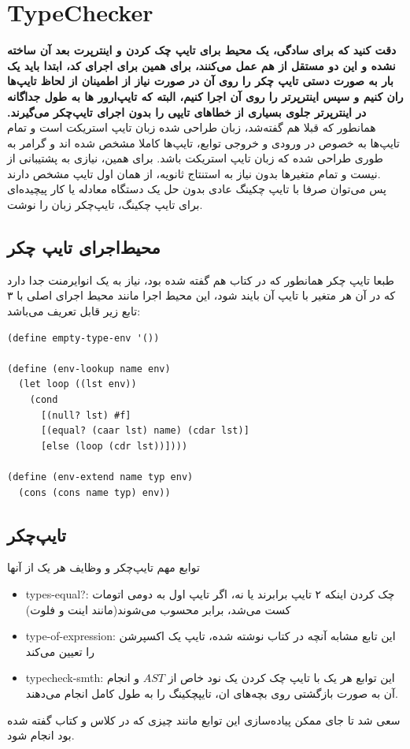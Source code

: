 \documentclass{article}
\begin{document}
\section{TypeChecker}
\textbf{دقت کنید که برای سادگی، یک محیط برای تایپ چک کردن و اینترپرت بعد آن ساخته نشده و این دو مستقل از هم عمل می‌کنند، برای همین برای 
اجرای کد، ابتدا باید یک بار به صورت دستی تایپ چکر را روی آن در صورت نیاز از اطمینان از لحاظ تایپ‌ها ران کنیم و سپس اینترپرتر را روی آن اجرا کنیم، 
البته که تایپ‌ارور ها به طول جداگانه در اینترپرتر جلوی بسیاری از خطا‌های تایپی را بدون اجرای تایپ‌چکر می‌گیرند.
}
همانطور که قبلا هم گفته‌شد، زبان طراحی شده زبان تایپ استریکت است و تمام تایپ‌ها به خصوص در ورودی و خروجی توابع، 
تایپ‌ها کاملا مشخص شده اند و گرامر به طوری طراحی شده که زبان تایپ استریکت باشد. برای همین، 
نیازی به پشتیبانی از 
نیست و تمام متغیر‌ها بدون نیاز به استنتاج ثانویه، از همان اول تایپ مشخص دارند.
\\
پس می‌توان صرفا با تایپ چکینگ عادی بدون حل یک دستگاه معادله یا کار پیچیده‌ای برای تایپ چکینگ، 
تایپ‌چکر زبان را نوشت.
\subsection{محیط‌اجرای تایپ چکر}
طبعا تایپ چکر همانطور که در کتاب هم گفته شده بود، نیاز به یک انوایرمنت جدا دارد که در آن هر متغیر با تایپ آن بایند شود، 
این محیط اجرا مانند محیط اجرای اصلی با ۳ تابع زیر قابل تعریف می‌باشد:
\begin{verbatim}
(define empty-type-env '())

(define (env-lookup name env)
  (let loop ((lst env))
    (cond
      [(null? lst) #f]
      [(equal? (caar lst) name) (cdar lst)]
      [else (loop (cdr lst))])))

(define (env-extend name typ env)
  (cons (cons name typ) env))
\end{verbatim}
\subsection{تایپ‌چکر}
توابع مهم تایپ‌چکر و وظایف هر یک از آنها
\begin{itemize}
        \item types-equal?: چک کردن اینکه ۲ تایپ برابرند یا نه، اگر تایپ اول به دومی اتومات کست می‌شد، برابر محسوب می‌شوند(مانند اینت و فلوت)
        \item type-of-expression: این تابع مشابه آنچه در کتاب نوشته شده، تایپ یک اکسپرشن را تعیین می‌کند
        \item typecheck-smth: این توابع هر یک با تایپ چک کردن یک نود خاص از $AST$ و انجام آن به صورت بازگشتی روی بچه‌های ان، تایپچکینگ را به طول کامل انجام می‌دهند. 
\end{itemize}
سعی شد تا جای ممکن پیاده‌سازی این توابع مانند چیزی که در کلاس و کتاب گفته شده بود انجام شود.
\end{document}
